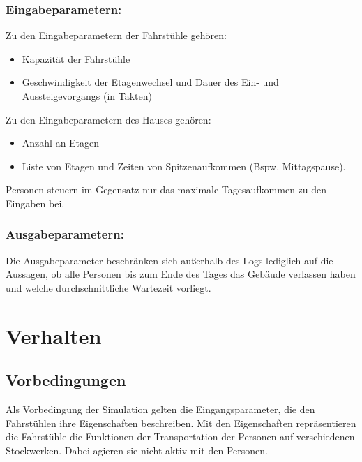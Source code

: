 \documentclass[envcountsame, envcountchap, deutsch]{i-studis}
\providecommand{\tightlist}{%
  \setlength{\itemsep}{0pt}\setlength{\parskip}{0pt}}
\begin{document}
\hypertarget{eingabeparametern}{%
\subsection{Eingabeparametern:}\label{eingabeparametern}}

Zu den Eingabeparametern der Fahrstühle gehören:

\begin{itemize}
\tightlist
\item
  Kapazität der Fahrstühle
\item
  Geschwindigkeit der Etagenwechsel und Dauer des Ein- und
  Aussteigevorgangs (in Takten)
\end{itemize}

Zu den Eingabeparametern des Hauses gehören:

\begin{itemize}
\tightlist
\item
  Anzahl an Etagen
\item
  Liste von Etagen und Zeiten von Spitzenaufkommen (Bspw. Mittagspause).
\end{itemize}

Personen steuern im Gegensatz nur das maximale Tagesaufkommen zu den
Eingaben bei.

\hypertarget{ausgabeparametern}{%
\subsection{Ausgabeparametern:}\label{ausgabeparametern}}

Die Ausgabeparameter beschränken sich außerhalb des Logs lediglich auf
die Aussagen, ob alle Personen bis zum Ende des Tages das Gebäude
verlassen haben und welche durchschnittliche Wartezeit vorliegt.

\hypertarget{verhalten}{%
\chapter{Verhalten}\label{verhalten}}

\hypertarget{vorbedingungen}{%
\section{Vorbedingungen}\label{vorbedingungen}}

Als Vorbedingung der Simulation gelten die Eingangsparameter, die den
Fahrstühlen ihre Eigenschaften beschreiben. Mit den Eigenschaften
repräsentieren die Fahrstühle die Funktionen der Transportation der
Personen auf verschiedenen Stockwerken. Dabei agieren sie nicht aktiv
mit den Personen.
\end{document}
